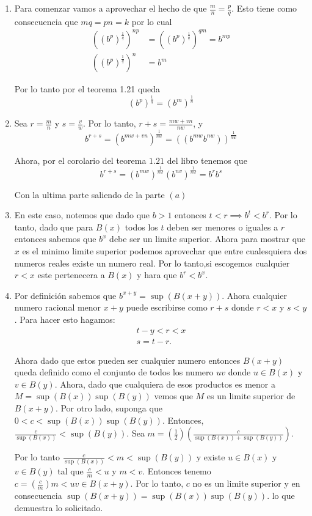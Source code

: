 \documentclass[12pt]{article}
\newenvironment{sol}[1][Solución]{\begin{trivlist}
\item[\hskip \labelsep {\bfseries #1:}]}{\end{trivlist}}
\begin{document}
\begin{sol}

	\begin{enumerate}

		\item Para comenzar vamos a aprovechar el hecho de que $\frac{m}{n} = \frac{p}{q}$. Esto tiene como consecuencia que $mq = pn = k$ por lo cual
			\begin{align*}
				((b^p)^{\frac{1}{q}})^{np} &= ((b^{p})^{\frac{1}{q}})^{qm} = b^{mp}\\
				((b^p)^{\frac{1}{q}})^n &= b^m
			\end{align*}

			Por lo tanto por el teorema 1.21 queda $$(b^p)^{\frac{1}{q}} = (b^m)^{\frac{1}{n}}$$
		\item Sea $r = \frac{m}{n}$ y $s = \frac{v}{w}$. Por lo tanto, $r + s = \frac{mw + vn}{nw}$, y 
			$$b^{r+s}=\left(b^{mw+vn}\right)^{\frac{1}{nw}} = \left(\left(b^{mw}b^{nw}\right)\right)^{\frac{1}{nw}}$$

			Ahora, por el corolario del teorema $1.21$ del libro tenemos que
			$$b^{r+s}=\left(b^{mw}\right)^{\frac{1}{nw}}\left(b^{nv}\right)^{\frac{1}{nw}}=b^rb^s$$

			Con la ultima parte saliendo de la parte $(a)$
		\item En este caso, notemos que dado que $b > 1$ entonces $t < r \implies b^t < b^r$. Por lo tanto, dado que para $B(x)$ todos los $t$ deben ser menores o iguales a $r$ entonces sabemos que $b^x$ debe ser un limite superior. Ahora para mostrar que $x$ es el minimo limite superior podemos aprovechar que entre cualesquiera dos numeros reales existe un numero real. Por lo tanto,si escogemos cualquier $r<x$ este pertenecera a $B(x)$ y hara que $b^r < b^x$.
		\item Por definición sabemos que $b^{x+y}=\sup\left(B(x + y)\right)$. Ahora cualquier numero racional menor $x + y$ puede escribirse como $r + s$ donde $r < x$ y $s < y$. Para hacer esto hagamos: 
			\begin{align*}
				t - y < r < x\\
				s = t - r.
			\end{align*}

			Ahora dado que estos pueden ser cualquier numero entonces $B(x+y)$ queda definido como el conjunto de todos los numero $uv$ donde $u\in B(x)$ y $v\in B(y)$. Ahora, dado que cualquiera de esos productos es menor a $M = \sup(B(x))\sup(B(y))$ vemos que $M$ es un limite superior de $B(x+y)$. Por otro lado, suponga que $0<c<\sup(B(x))\sup(B(y))$. Entonces, $\frac{c}{\sup(B(x))} < \sup(B(y))$. Sea $m=\left(\frac{1}{2}\right)\left(\frac{c}{\sup(B(x))+\sup(B(y))}\right)$.

			Por lo tanto $\frac{c}{\sup(B(x))} < m < \sup(B(y))$ y existe $u\in B(x)$ y $v\in B(y)$ tal que $\frac{c}{m} < u$ y $m < v$. Entonces tenemo $c = \left(\frac{c}{m}\right)m < uv \in B(x+y)$. Por lo tanto, $c$ no es un limite superior y en consecuencia $\sup(B(x+y)) = \sup(B(x))\sup(B(y))$. lo que demuestra lo solicitado.
	\end{enumerate}
\end{sol}
\end{document}
